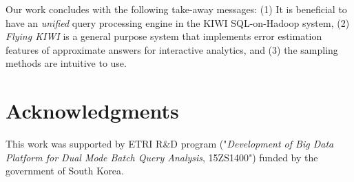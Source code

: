 \documentclass{sig-alternate-05-2015}
\begin{document}
Our work concludes with the following take-away messages:
(1) It is beneficial to have an \textit{unified} query processing engine in the KIWI SQL-on-Hadoop system,
(2) \textit{Flying KIWI} is a general purpose system that implements error estimation features of approximate answers for interactive analytics, and (3) the sampling methods are intuitive to use.

\section*{Acknowledgments}
This work was supported by ETRI R\&D program ("\textit{Development of Big Data Platform for Dual Mode Batch Query Analysis}, 15ZS1400") funded by the government of South Korea.














































\small{


}
\end{document}
